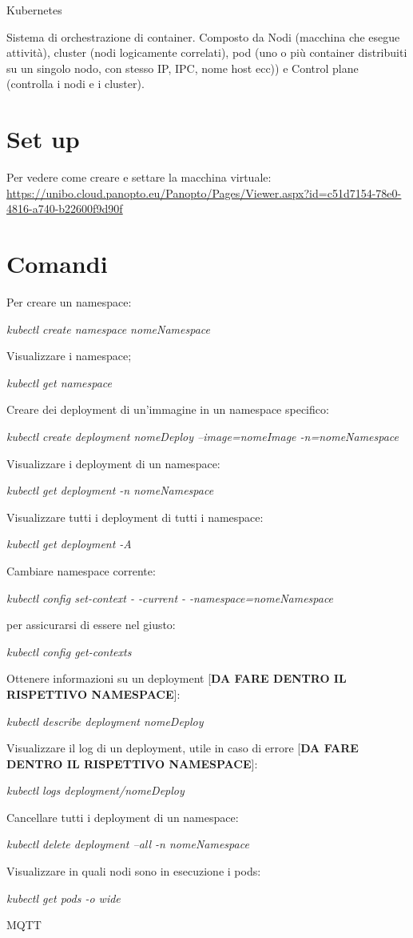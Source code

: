 Kubernetes

Sistema di orchestrazione di container. Composto da Nodi (macchina che
esegue attività), cluster (nodi logicamente correlati), pod (uno o più
container distribuiti su un singolo nodo, con stesso IP, IPC, nome host
ecc)) e Control plane (controlla i nodi e i cluster).

\section{Set up}\label{set-up}

Per vedere come creare e settare la macchina virtuale:
\href{https://unibo.cloud.panopto.eu/Panopto/Pages/Viewer.aspx?id=c51d7154-78e0-4816-a740-b22600f9d90f}{\ul{https://unibo.cloud.panopto.eu/Panopto/Pages/Viewer.aspx?id=c51d7154-78e0-4816-a740-b22600f9d90f}}

\section{Comandi}\label{comandi}

Per creare un namespace:

\emph{kubectl create namespace nomeNamespace}

Visualizzare i namespace;

\emph{kubectl get namespace}

Creare dei deployment di un'immagine in un namespace specifico:

\emph{kubectl create deployment nomeDeploy --image=nomeImage
-n=nomeNamespace}

Visualizzare i deployment di un namespace:

\emph{kubectl get deployment -n nomeNamespace}

Visualizzare tutti i deployment di tutti i namespace:

\emph{kubectl get deployment -A}

Cambiare namespace corrente:

\emph{kubectl config set-context - -current - -namespace=nomeNamespace}

per assicurarsi di essere nel giusto:

\emph{kubectl config get-contexts}

Ottenere informazioni su un deployment {[}\textbf{DA FARE DENTRO IL
RISPETTIVO NAMESPACE}{]}:

\emph{kubectl describe deployment nomeDeploy}

Visualizzare il log di un deployment, utile in caso di errore
{[}\textbf{DA FARE DENTRO IL RISPETTIVO NAMESPACE}{]}:

\emph{kubectl logs deployment/nomeDeploy}

Cancellare tutti i deployment di un namespace:

\emph{kubectl delete deployment --all -n nomeNamespace}

Visualizzare in quali nodi sono in esecuzione i pods:

\emph{kubectl get pods -o wide}

MQTT
